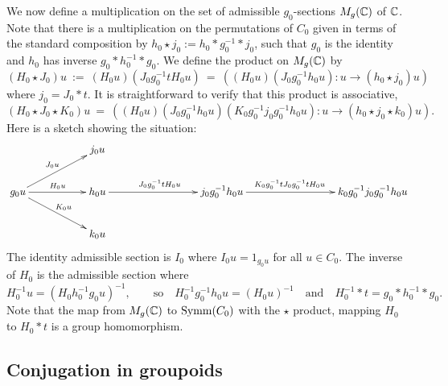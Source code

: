 \medskip
We now define a multiplication on the set of admissible $g_0$-sections 
$M_g(\mathbb{C})$ of $\mathbb{C}$. 
Note that there is a multiplication on the permutations of $C_0$ 
given in terms of the standard composition by 
$h_0 \star j_0 := h_0 * g_0^{-1} * j_0$, 
such that $g_0$ is the identity and $h_0$ has inverse $g_0*h_0^{-1}*g_0$. 
We define the product on $M_g(\mathbb{C})$ by 
$$
(H_0 \star J_0)u ~:=~ (H_0 u)(J_0 g_0^{-1} t H_0 u) 
                  ~=~ ((H_0 u)(J_0 g_0^{-1} h_0 u) : u \to (h_0 \star j_0)u)  
$$
where $j_0=J_0*t$. 
It is straightforward to verify that this product is associative, 
$$
(H_0 \star J_0 \star K_0)u 
  ~=~  ((H_0 u)(J_0 g_0^{-1} h_0 u)(K_0 g_0^{-1} j_0 g_0^{-1} h_0 u) 
          : u \to (h_0 \star j_0 \star k_0)u). 
$$
Here is a sketch showing the situation: 
$$
\xymatrix{
  &&  j_0 u 
      &&& &&&   \\
g_0 u  \ar[rr]^{H_0 u} \ar[urr]^{J_0 u} \ar[drr]^{K_0 u} 
  &&  h_0u  \ar[rrr]^{J_0 g_0^{-1} t H_0 u} 
      &&&  j_0 g_0^{-1} h_0 u 
              \ar[rrr]^(0.45){K_0 g_0^{-1} t J_0 g_0^{-1} t H_0 u}
          &&&  k_0 g_0^{-1} j_0 g_0^{-1} h_0 u  \\
  &&  k_0 u 
      &&&  &&&  
}$$
The identity admissible section is $I_0$ 
where $I_0u = 1_{g_0 u}$ for all $u \in C_0$. 
The inverse of $H_0$ is the admissible section where 
$$
H_0^{-1} u = (H_0 h_0^{-1} g_0 u)^{-1}, 
\qquad\text{so}\quad 
H_0^{-1} g_0^{-1} h_0 u = (H_0 u)^{-1} 
\quad\text{and}\quad 
H_0^{-1}*t = g_0 * h_0^{-1} * g_0. 
$$
Note that the map from $M_g(\mathbb{C})$ to $\mathrm{Symm}(C_0)$ with the $\star$ product, 
mapping $H_0$ to $H_0*t$ is a group homomorphism.




\newpage
\subsection{Conjugation in groupoids}

